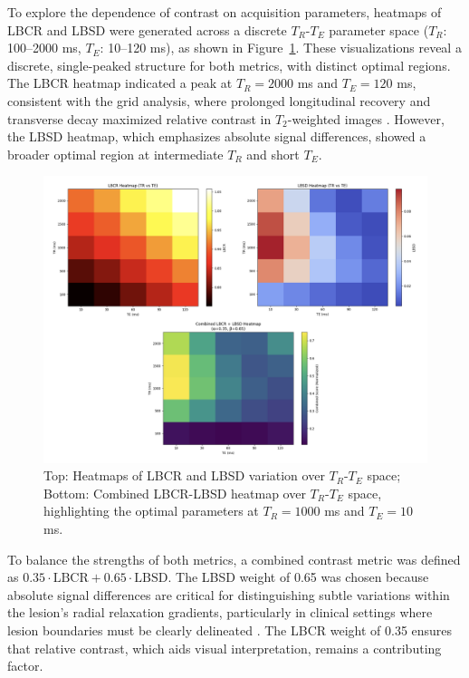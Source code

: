 \documentclass[10pt,a4paper,twoside]{article}
\begin{document}
To explore the dependence of contrast on acquisition parameters, heatmaps of LBCR and LBSD were generated across a discrete \( T_R \)-\( T_E \) parameter space (\( T_R \): 100–2000 ms, \( T_E \): 10–120 ms), as shown in Figure~\ref{fig:lbcrsurface}. These visualizations reveal a discrete, single-peaked structure for both metrics, with distinct optimal regions. The LBCR heatmap indicated a peak at \( T_R = 2000 \) ms and \( T_E = 120 \) ms, consistent with the grid analysis, where prolonged longitudinal recovery and transverse decay maximized relative contrast in \( T_2 \)-weighted images \cite{bernstein2004}. However, the LBSD heatmap, which emphasizes absolute signal differences, showed a broader optimal region at intermediate \( T_R \) and short \( T_E \).

\begin{figure}[htbp!]
\centering
\includegraphics[width=\textwidth]{lbcrlbsdcombinedheatmaps.png}
\caption{Top: Heatmaps of LBCR and LBSD variation over \( T_R \)-\( T_E \) space; Bottom: Combined LBCR-LBSD heatmap over \( T_R \)-\( T_E \) space, highlighting the optimal parameters at \( T_R = 1000 \) ms and \( T_E = 10 \) ms.}
\label{fig:lbcrsurface}
\end{figure}

To balance the strengths of both metrics, a combined contrast metric was defined as \( 0.35 \cdot \text{LBCR} + 0.65 \cdot \text{LBSD} \). The LBSD weight of 0.65 was chosen because absolute signal differences are critical for distinguishing subtle variations within the lesion’s radial relaxation gradients, particularly in clinical settings where lesion boundaries must be clearly delineated \cite{does2002}. The LBCR weight of 0.35 ensures that relative contrast, which aids visual interpretation, remains a contributing factor. 
\end{document}

